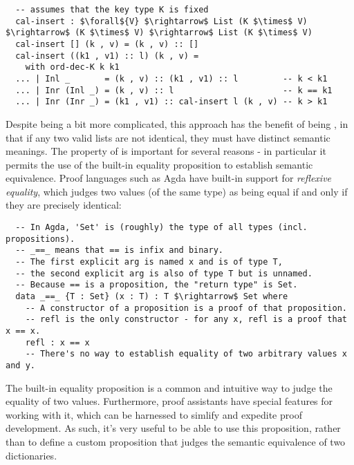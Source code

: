 \begin{minipage}{\linewidth}
\begin{lstlisting}
  -- assumes that the key type K is fixed
  cal-insert : $\forall${V} $\rightarrow$ List (K $\times$ V) $\rightarrow$ (K $\times$ V) $\rightarrow$ List (K $\times$ V)
  cal-insert [] (k , v) = (k , v) :: []
  cal-insert ((k1 , v1) :: l) (k , v) =
    with ord-dec-K k k1
  ... | Inl _       = (k , v) :: (k1 , v1) :: l         -- k < k1
  ... | Inr (Inl _) = (k , v) :: l                      -- k == k1
  ... | Inr (Inr _) = (k1 , v1) :: cal-insert l (k , v) -- k > k1
\end{lstlisting}
\end{minipage}

Despite being a bit more complicated, this approach has the benefit of being \extensional{}, in that if any two valid lists are not identical, they must have distinct semantic meanings.
%
The property of \SemInj{} is important for several reasons - in particular it permits the use of the built-in equality proposition to establish semantic equivalence.
%
Proof languages such as Agda have built-in support for \emph{reflexive equality}, which judges two values (of the same type) as being equal if and only if they are precisely identical:
\begin{lstlisting}
  -- In Agda, 'Set' is (roughly) the type of all types (incl. propositions).
  -- _==_ means that == is infix and binary.
  -- The first explicit arg is named x and is of type T,
  -- the second explicit arg is also of type T but is unnamed.
  -- Because == is a proposition, the "return type" is Set.
  data _==_ {T : Set} (x : T) : T $\rightarrow$ Set where
    -- A constructor of a proposition is a proof of that proposition.
    -- refl is the only constructor - for any x, refl is a proof that x == x.
    refl : x == x
    -- There's no way to establish equality of two arbitrary values x and y.
\end{lstlisting}

The built-in equality proposition is a common and intuitive way to judge the equality of two values.
%
Furthermore, proof assistants have special features for working with it, which can be harnessed to simlify and expedite proof development.
%
As such, it's very useful to be able to use this proposition, rather than to define a custom proposition that judges the semantic equivalence of two dictionaries.

